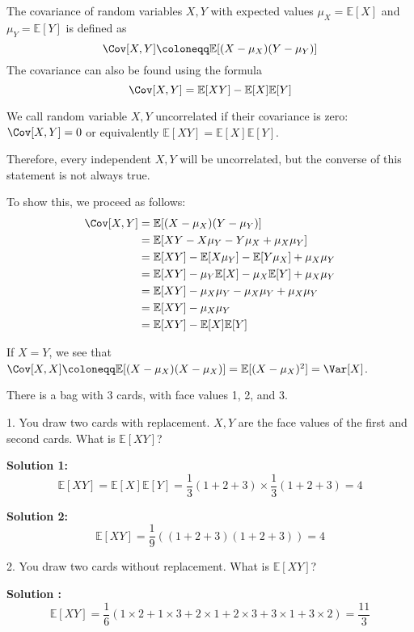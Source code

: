 \begin{definition}[Covariance]
    The covariance of random variables \(X, Y\) with expected values \(\mu_X = \mathbb{E}[X]\) and \(\mu_Y = \mathbb{E}[Y]\) is defined as 
    \[
        \Cov[X, Y] \coloneqq \mathbb{E}[(X - \mu_X)(Y - \mu_Y)]
    \]
    The covariance can also be found using the formula 
    \[
        \Cov[X, Y] = \mathbb{E}[XY] - \mathbb{E}[X]\mathbb{E}[Y]
    \]

    \begin{remark}
        We call random variable \(X, Y\) uncorrelated if their covariance is zero: \(\Cov[X, Y] = 0\) or equivalently \(\mathbb{E}[XY] = \mathbb{E}[X]\mathbb{E}[Y]\). 

        Therefore, every independent \(X, Y\) will be uncorrelated, but the converse of this statement is not always true. 
    \end{remark}
\end{definition}

To show this, we proceed as follows:
\[
    \begin{aligned}
        \Cov[X, Y] &= \mathbb{E}[(X - \mu_X)(Y - \mu_Y)] \\
        &= \mathbb{E}[XY - X\mu_Y - Y\mu_X + \mu_X\mu_Y] \\
        &= \mathbb{E}[XY] - \mathbb{E}[X\mu_Y] - \mathbb{E}[Y\mu_X] + \mu_X\mu_Y \\
        &= \mathbb{E}[XY] - \mu_Y\mathbb{E}[X] - \mu_X\mathbb{E}[Y] + \mu_X\mu_Y \\
        &= \mathbb{E}[XY] - \mu_X\mu_Y - \mu_X\mu_Y + \mu_X\mu_Y \\
        &= \mathbb{E}[XY] - \mu_X\mu_Y \\
        &= \mathbb{E}[XY] - \mathbb{E}[X]\mathbb{E}[Y]
    \end{aligned}
\]

If \(X = Y\), we see that \(\Cov[X, X] \coloneqq \mathbb{E}[(X - \mu_X)(X - \mu_X)] = \mathbb{E}[(X - \mu_X)^2] = \Var[X]\).

\begin{eg}
    There is a bag with 3 cards, with face values 1, 2, and 3.
    
    1. You draw two cards with replacement. \(X, Y\) are the face values of the first and second cards. What is \(\mathbb{E}[XY]\)?

    \textbf{Solution 1:} 
    \[
        \mathbb{E}[XY] = \mathbb{E}[X]\mathbb{E}[Y] = \dfrac{1}{3}(1 + 2 + 3) \times \dfrac{1}{3}(1 + 2 + 3) = 4
    \]

    \textbf{Solution 2:} 
    \[
        \mathbb{E}[XY] = \dfrac{1}{9}((1 + 2 + 3)(1 + 2 + 3)) = 4
    \]

    2. You draw two cards without replacement. What is \(\mathbb{E}[XY]\)?

    \textbf{Solution :} 
    \[
        \mathbb{E}[XY] = \dfrac{1}{6}(1 \times 2 + 1 \times 3 + 2 \times 1 + 2 \times 3 + 3 \times 1 + 3 \times 2) = \dfrac{11}{3}
    \]
\end{eg}


